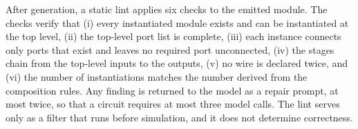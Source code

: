 \documentclass[conference]{IEEEtran}
\begin{document}

After generation, a static lint applies six checks to the emitted module.
The checks verify that (i) every instantiated module exists and can be
instantiated at the top level, (ii) the top-level port list is complete,
(iii) each instance connects only ports that exist and leaves no required
port unconnected, (iv) the stages chain from the top-level inputs to the
outputs, (v) no wire is declared twice, and (vi) the number of
instantiations matches the number derived from the composition rules. Any finding is
returned to the model as a repair prompt, at most twice, so that a circuit
requires at most three model calls. The lint serves only as a filter that
runs before simulation, and it does not determine correctness.

\end{document}
